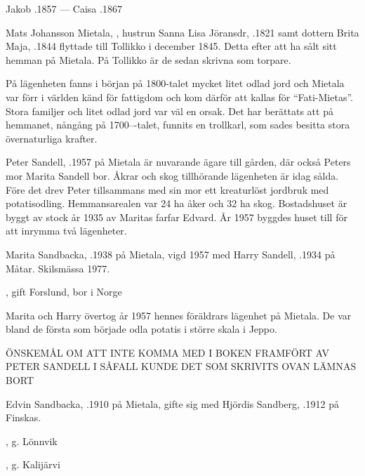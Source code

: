 Jakob .1857  ---  Caisa .1867


Mats Johansson Mietala, , hustrun Sanna Lisa Jöransdr, .1821 samt dottern Brita Maja,  .1844 flyttade till Tollikko i december 1845. Detta efter att ha sålt sitt hemman på Mietala. På Tollikko är de sedan skrivna som torpare.

På lägenheten fanns i början på 1800-talet mycket litet odlad jord och Mietala var förr i världen känd för fattigdom och kom därför att kallas för ``Fati-Mietas''. Stora familjer och litet odlad jord var väl en orsak. Det har berättats att på hemmanet, nångång på 1700---talet, funnits en trollkarl, som sades besitta stora övernaturliga krafter.






Peter Sandell, .1957 på Mietala är nuvarande ägare till gården, där också Peters mor Marita Sandell bor. Åkrar och skog tillhörande lägenheten är idag sålda. Före det drev Peter tillsammans med sin mor ett kreaturlöst jordbruk med potatisodling. Hemmansarealen var 24 ha åker och 32 ha skog. Bostadshuset är byggt av stock år 1935 av Maritas farfar Edvard. År 1957 byggdes huset till för att inrymma två lägenheter.


Marita  Sandbacka, .1938 på Mietala, vigd 1957 med Harry Sandell, .1934 på Måtar. Skilsmässa 1977.
\begin{jhchildren}
  \item {}
  \item {}, gift Forslund, bor i Norge
\end{jhchildren}
Marita och Harry övertog år 1957 hennes föräldrars lägenhet på Mietala. De var bland de första som började odla potatis i större skala i Jeppo.

ÖNSKEMÅL OM ATT INTE KOMMA MED I BOKEN FRAMFÖRT AV PETER SANDELL I SÅFALL KUNDE  DET SOM SKRIVITS OVAN LÄMNAS BORT


Edvin Sandbacka, .1910 på Mietala, gifte sig med Hjördis Sandberg, .1912 på Finskas.
\begin{jhchildren}
  \item {}, g. Lönnvik
  \item {}
  \item {}, g. Kalijärvi
\end{jhchildren}

